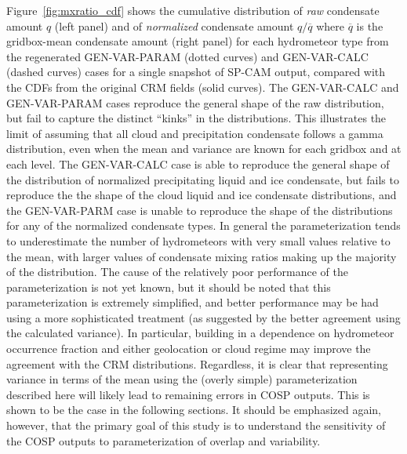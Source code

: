 Figure~\ref{fig:mxratio_cdf} shows the cumulative distribution of
\emph{raw} condensate amount \(q\) (left panel) and of \emph{normalized}
condensate amount \(q / \overline{q}\) where \(\overline{q}\) is the
gridbox-mean condensate amount (right panel) for each hydrometeor type
from the regenerated GEN-VAR-PARAM (dotted curves) and GEN-VAR-CALC
(dashed curves) cases for a single snapshot of SP-CAM output, compared
with the CDFs from the original CRM fields (solid curves). The
GEN-VAR-CALC and GEN-VAR-PARAM cases reproduce the general shape of the
raw distribution, but fail to capture the distinct ``kinks'' in the
distributions. This illustrates the limit of assuming that all cloud and
precipitation condensate follows a gamma distribution, even when the
mean and variance are known for each gridbox and at each level. The
GEN-VAR-CALC case is able to reproduce the general shape of the
distribution of normalized precipitating liquid and ice condensate, but
fails to reproduce the the shape of the cloud liquid and ice condensate
distributions, and the GEN-VAR-PARM case is unable to reproduce the
shape of the distributions for any of the normalized condensate types.
In general the parameterization tends to underestimate the number of
hydrometeors with very small values relative to the mean, with larger
values of condensate mixing ratios making up the majority of the
distribution. The cause of the relatively poor performance of the
parameterization is not yet known, but it should be noted that this
parameterization is extremely simplified, and better performance may be
had using a more sophisticated treatment (as suggested by the better
agreement using the calculated variance). In particular, building in a
dependence on hydrometeor occurrence fraction and either geolocation or
cloud regime may improve the agreement with the CRM distributions.
Regardless, it is clear that representing variance in terms of the mean
using the (overly simple) parameterization described here will likely
lead to remaining errors in COSP outputs. This is shown to be the case
in the following sections. It should be emphasized again, however, that
the primary goal of this study is to understand the sensitivity of the
COSP outputs to parameterization of overlap and variability.

